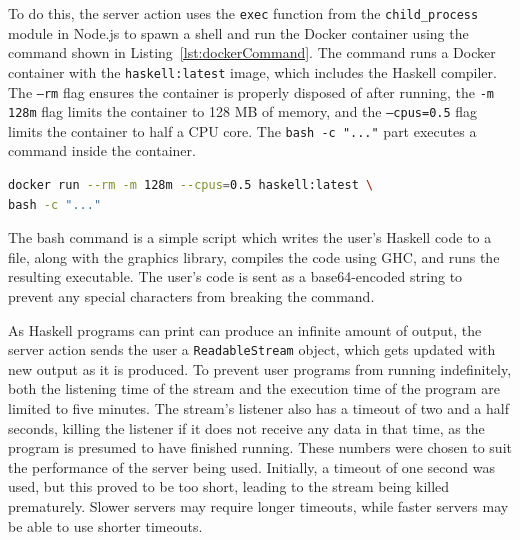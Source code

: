 \documentclass[../main.tex]{subfiles}
\begin{document}
                    To do this, the server action uses the \texttt{exec} function from the
                        \texttt{child\_process} module in Node.js to spawn a shell and run the Docker
                        container using the command shown in Listing~\ref{lst:dockerCommand}.
                    The command runs a Docker container with the \texttt{haskell:latest} image,
                        which includes the Haskell compiler.
                    The \texttt{--rm} flag ensures the container is properly disposed of after
                        running, the \texttt{-m 128m} flag limits the container to 128 MB of memory,
                        and the \texttt{--cpus=0.5} flag limits the container to half a CPU core.
                    The \verb|bash -c "..."| part executes a command inside the container.

                    \begin{lstlisting}[language={bash}, label={lst:dockerCommand}, caption={The command used to run the 
                        Haskell code in a Docker container. The backslash is used to escape the newline character.}] 
docker run --rm -m 128m --cpus=0.5 haskell:latest \
bash -c "..."\end{lstlisting}

                    The bash command is a simple script which writes the user's Haskell code to a
                        file, along with the graphics library, compiles the code using GHC, and runs
                        the resulting executable.
                    The user's code is sent as a base64-encoded string to prevent any special
                        characters from breaking the command.

                    As Haskell programs can print can produce an infinite amount of output, the
                        server action sends the user a \texttt{ReadableStream} object, which gets
                        updated with new output as it is produced.
                    To prevent user programs from running indefinitely, both the listening time of
                        the stream and the execution time of the program are limited to five minutes.
                    The stream's listener also has a timeout of two and a half seconds, killing the
                        listener if it does not receive any data in that time, as the program is
                        presumed to have finished running.
                    These numbers were chosen to suit the performance of the server being used.
                    Initially, a timeout of one second was used, but this proved to be too short,
                        leading to the stream being killed prematurely.
                    Slower servers may require longer timeouts, while faster servers may be able to
                        use shorter timeouts.
\end{document}
